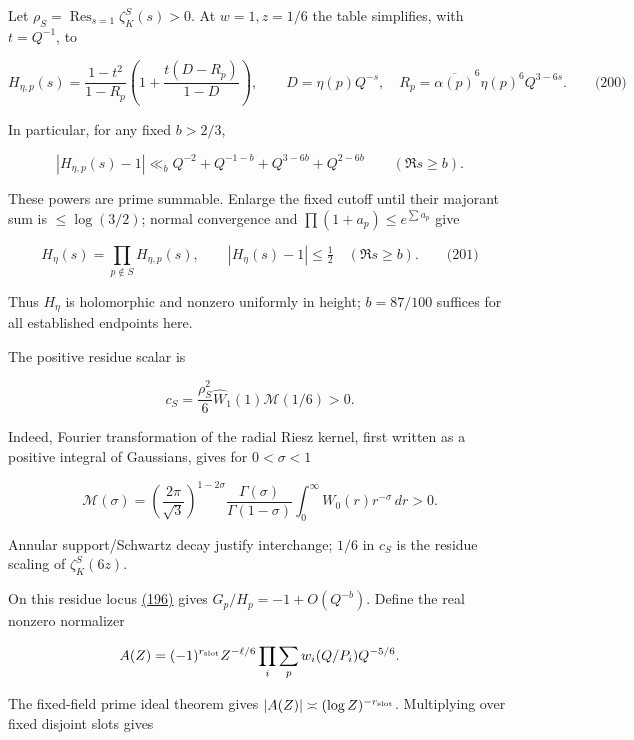 Let \(\rho_S=\operatorname{Res}_{s=1}\zeta_K^S(s)>0\). At \(w=1,z=1/6\) the table simplifies, with \(t=Q^{-1}\), to

\hypertarget{dr:principal-local}{}

\label{dr:principal-local}

\[
H_{\eta,p}(s)=\frac{1-t^2}{1-R_p}
 \left(1+\frac{t(D-R_p)}{1-D}\right),\qquad
 D=\eta(p)Q^{-s},\quad
 R_p=\overline{\alpha(p)}^6\eta(p)^6Q^{3-6s}.
 \qquad\text{(200)}
\]

In particular, for any fixed \(b>2/3\),

\[
|H_{\eta,p}(s)-1|\ll_b
 Q^{-2}+Q^{-1-b}+Q^{3-6b}+Q^{2-6b}\qquad(\Re s\ge b).
\]

These powers are prime summable. Enlarge the fixed cutoff until their majorant sum is \(\le\log(3/2)\); normal convergence and \(\prod(1+a_p)\le e^{\sum a_p}\) give

\hypertarget{dr:H-nonzero}{}

\label{dr:H-nonzero}

\[
H_\eta(s)=\prod_{p\notin S}H_{\eta,p}(s),\qquad
 |H_\eta(s)-1|\le\tfrac12\quad (\Re s\ge b).
 \qquad\text{(201)}
\]

Thus \(H_\eta\) is holomorphic and nonzero uniformly in height; \(b=87/100\) suffices for all established endpoints here.

The positive residue scalar is

\[
c_S=\frac{\rho_S^2}{6}\widehat W_1(1)\mathscr M(1/6)>0.
\]

Indeed, Fourier transformation of the radial Riesz kernel, first written as a positive integral of Gaussians, gives for \(0<\sigma<1\)

\[
\mathscr M(\sigma)=\left(\frac{2\pi}{\sqrt3}\right)^{1-2\sigma}
 \frac{\Gamma(\sigma)}{\Gamma(1-\sigma)}
 \int_0^\infty W_0(r)r^{-\sigma}\,dr>0.
\]

Annular support/Schwartz decay justify interchange; \(1/6\) in \(c_S\) is the residue scaling of \(\zeta_K^S(6z)\).

On this residue locus \protect\hyperlink{dr:Delta}{(196)} gives \(G_p/H_p=-1+O(Q^{-b})\). Define the real nonzero normalizer

\[
A(Z)=(-1)^{r_{\rm slot}}Z^{-\ell/6}
       \prod_i\sum_pw_i(Q/P_i)Q^{-5/6}.
\]

The fixed-field prime ideal theorem gives \(|A(Z)|\asymp(\log Z)^{-r_{\rm slot}}\). Multiplying over fixed disjoint slots gives

\hypertarget{dr:prime-residue}{}

